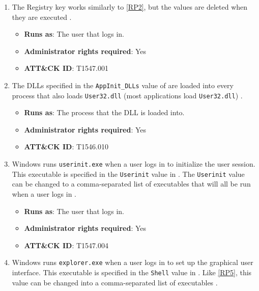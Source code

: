 \begin{enumerate}[label={\textbf{RP\arabic*}:}, ref=RP\arabic*, start=0]
    \item \label{RP3} The Registry key  works similarly to \autoref{RP2}, but the values are deleted when they are executed \cite{andrea-blog} \cite{run-key}.

    \begin{itemize}[label={}, leftmargin=*]
        \item \textbf{Runs as}: The user that logs in.
        \item \textbf{Administrator rights required}: Yes
        \item \textbf{ATT\&CK ID}: T1547.001
    \end{itemize}

    \item \label{RP4} The DLLs specified in the \texttt{AppInit\_DLLs} value of  are loaded into every process that also loads \texttt{User32.dll} (most applications load \texttt{User32.dll}) \cite{andrea-blog} \cite{practical-malware-analysis}.

    \begin{itemize}[label={}, leftmargin=*]
        \item \textbf{Runs as}: The process that the DLL is loaded into.
        \item \textbf{Administrator rights required}: Yes
        \item \textbf{ATT\&CK ID}: T1546.010
    \end{itemize}

    \item \label{RP5} Windows runs \texttt{userinit.exe} when a user logs in to initialize the user session. This executable is specified in the \texttt{Userinit} value in . The \texttt{Userinit} value can be changed to a comma-separated list of executables that will all be run when a user logs in \cite{andrea-blog} \cite{winlogon-persistence}.

    \begin{itemize}[label={}, leftmargin=*]
        \item \textbf{Runs as}: The user that logs in.
        \item \textbf{Administrator rights required}: Yes
        \item \textbf{ATT\&CK ID}: T1547.004
    \end{itemize}

    \item \label{RP6} Windows runs \texttt{explorer.exe} when a user logs in to set up the graphical user interface. This executable is specified in the \texttt{Shell} value in . Like \autoref{RP5}, this value can be changed into a comma-separated list of executables \cite{andrea-blog} \cite{winlogon-persistence}.


\end{enumerate}
